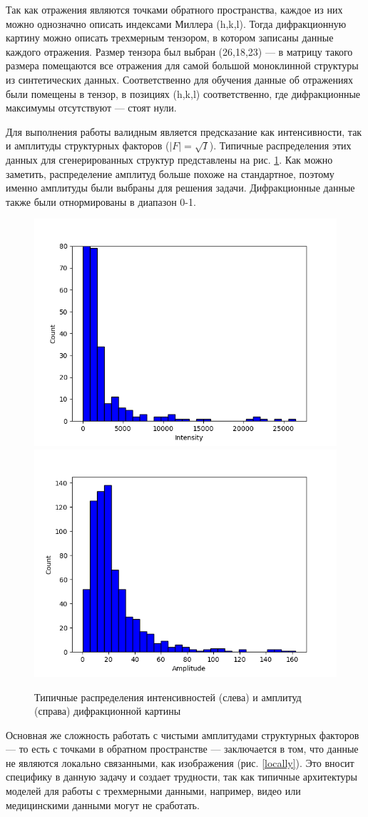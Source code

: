 Так как отражения являются точками обратного пространства, каждое из них можно однозначно описать индексами Миллера (h,k,l). Тогда дифракционную картину можно описать трехмерным тензором, в котором записаны данные каждого отражения. Размер тензора был выбран (26,18,23) --- в матрицу такого размера помещаются все отражения для самой большой моноклинной структуры из синтетических данных. Соответственно для обучения данные об отражениях были помещены в тензор, в позициях (h,k,l) соответственно, где дифракционные максимумы отсутствуют --- стоят нули.

Для выполнения работы валидным является предсказание как интенсивности, так и амплитуды структурных факторов ($|F| = \sqrt{I}$). Типичные распределения этих данных для сгенерированных структур представлены на рис. \ref{F_dist}. Как можно заметить, распределение амплитуд больше похоже на стандартное, поэтому именно амплитуды были выбраны для решения задачи. Дифракционные данные также были отнормированы в диапазон 0-1.

\begin{figure}[ht!]
            \includegraphics[width=.5\textwidth]{figures/F2_distribution.png}\hfill
            \includegraphics[width=.5\textwidth]{figures/F_distribution.png}
            \caption{Типичные распределения интенсивностей (слева) и амплитуд (справа) дифракционной картины}
            \label{F_dist}
\end{figure}

Основная же сложность работать с чистыми амплитудами структурных факторов --- то есть с точками в обратном пространстве --- заключается в том, что данные не являются локально связанными, как изображения (рис. \ref{locally}). Это вносит специфику в данную задачу и создает трудности, так как типичные архитектуры моделей для работы с трехмерными данными, например, видео или медицинскими данными \cite{mrt} могут не сработать.

